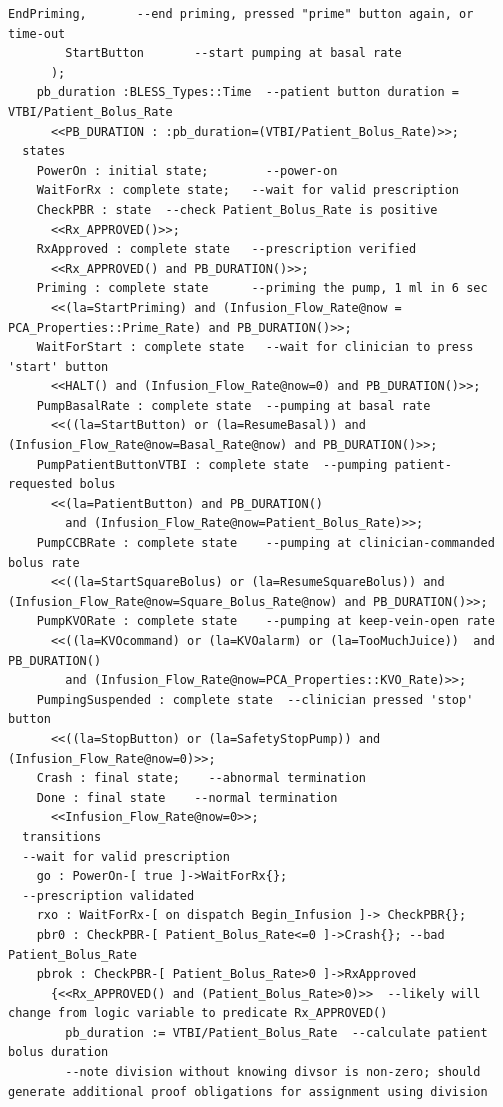 \begin{lstlisting}[language=aadl, frame=single, gobble=0, caption={\lstinline{Rate_Controller} thread from \lstinline{PCA_Operation} component with BLESS assertions}, label={listing:rate_controller}]
        EndPriming,       --end priming, pressed "prime" button again, or time-out 
        StartButton       --start pumping at basal rate
      );    
    pb_duration :BLESS_Types::Time  --patient button duration = VTBI/Patient_Bolus_Rate
      <<PB_DURATION : :pb_duration=(VTBI/Patient_Bolus_Rate)>>;
  states
    PowerOn : initial state;        --power-on
    WaitForRx : complete state;   --wait for valid prescription
    CheckPBR : state  --check Patient_Bolus_Rate is positive
      <<Rx_APPROVED()>>;
    RxApproved : complete state   --prescription verified
      <<Rx_APPROVED() and PB_DURATION()>>;
    Priming : complete state      --priming the pump, 1 ml in 6 sec
      <<(la=StartPriming) and (Infusion_Flow_Rate@now = PCA_Properties::Prime_Rate) and PB_DURATION()>>;
    WaitForStart : complete state   --wait for clinician to press 'start' button
      <<HALT() and (Infusion_Flow_Rate@now=0) and PB_DURATION()>>;
    PumpBasalRate : complete state  --pumping at basal rate
      <<((la=StartButton) or (la=ResumeBasal)) and (Infusion_Flow_Rate@now=Basal_Rate@now) and PB_DURATION()>>;
    PumpPatientButtonVTBI : complete state  --pumping patient-requested bolus
      <<(la=PatientButton) and PB_DURATION()
        and (Infusion_Flow_Rate@now=Patient_Bolus_Rate)>>;
    PumpCCBRate : complete state    --pumping at clinician-commanded bolus rate
      <<((la=StartSquareBolus) or (la=ResumeSquareBolus)) and (Infusion_Flow_Rate@now=Square_Bolus_Rate@now) and PB_DURATION()>>;
    PumpKVORate : complete state    --pumping at keep-vein-open rate
      <<((la=KVOcommand) or (la=KVOalarm) or (la=TooMuchJuice))  and PB_DURATION()
        and (Infusion_Flow_Rate@now=PCA_Properties::KVO_Rate)>>;
    PumpingSuspended : complete state  --clinician pressed 'stop' button
      <<((la=StopButton) or (la=SafetyStopPump)) and (Infusion_Flow_Rate@now=0)>>;
    Crash : final state;    --abnormal termination
    Done : final state    --normal termination
      <<Infusion_Flow_Rate@now=0>>;
  transitions
  --wait for valid prescription
    go : PowerOn-[ true ]->WaitForRx{};  
  --prescription validated
    rxo : WaitForRx-[ on dispatch Begin_Infusion ]-> CheckPBR{};
    pbr0 : CheckPBR-[ Patient_Bolus_Rate<=0 ]->Crash{}; --bad Patient_Bolus_Rate
    pbrok : CheckPBR-[ Patient_Bolus_Rate>0 ]->RxApproved
      {<<Rx_APPROVED() and (Patient_Bolus_Rate>0)>>  --likely will change from logic variable to predicate Rx_APPROVED()
        pb_duration := VTBI/Patient_Bolus_Rate  --calculate patient bolus duration
        --note division without knowing divsor is non-zero; should generate additional proof obligations for assignment using division

\end{lstlisting}
